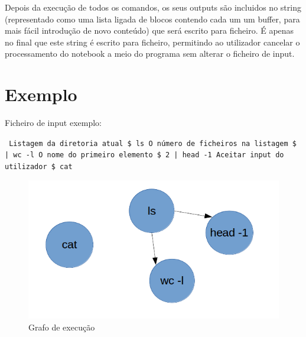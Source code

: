\documentclass[12pt]{report}
\begin{document}
 Depois da execução de todos os comandos, os seus outputs são incluidos no string (representado como uma lista ligada de blocos contendo cada um um buffer, para mais fácil introdução de novo conteúdo) que será escrito para ficheiro. É apenas no final que este string é escrito para ficheiro, permitindo ao utilizador cancelar o processamento do notebook a meio do programa sem alterar o ficheiro de input.

\chapter{Exemplo}

\label{sec:exemplo}

Ficheiro de input exemplo:

\begin{small}
\texttt{
\newline Listagem da diretoria atual
\newline \$ ls\newline
\newline O número de ficheiros na listagem
\newline \$ | wc -l\newline
\newline O nome do primeiro elemento
\newline \$ 2 | head -1\newline
\newline Aceitar input do utilizador
\newline \$ cat
}
\end{small}

\begin{figure}
    \includegraphics[width=\linewidth]{grafo_execucao_exemplo.png}
    \caption{Grafo de execução}
    \label{fig:grafo_execucao}
\end{figure}
\end{document}
